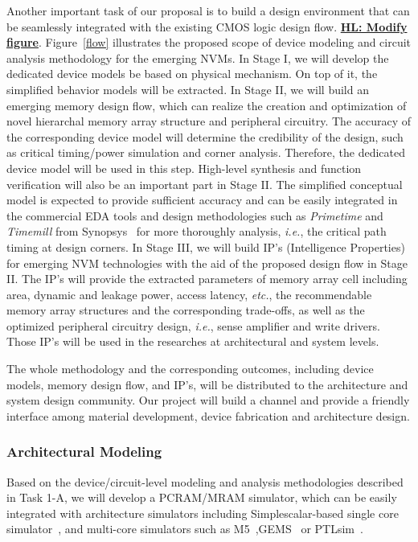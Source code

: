 Another important task of our proposal is to build a design environment that can be seamlessly integrated with the existing CMOS logic design flow. \textbf{\underline{HL: Modify figure}}. Figure~\ref{flow} illustrates the proposed scope of device modeling and circuit analysis methodology for the emerging NVMs. In Stage I, we will develop the dedicated device models be based on physical mechanism. On top of it, the simplified behavior models will be extracted. In Stage II, we will build an emerging memory design flow, which can realize the creation and optimization of novel hierarchal memory array structure and peripheral circuitry. The accuracy of the corresponding device model will determine the credibility of the design, such as critical timing/power simulation and corner analysis. Therefore, the dedicated device model will be used in this step. High-level synthesis and function verification will also be an important part in Stage II. The simplified conceptual model is expected to provide sufficient accuracy and %
can be easily integrated in the commercial EDA tools and design methodologies such as \emph{Primetime} and \emph{Timemill} from Synopsys~\cite{synopsys} for more thoroughly analysis, \emph{i.e.}, the critical path timing at design corners. In Stage III, we will build IP's (Intelligence Properties) for emerging NVM technologies with the aid of the proposed design flow in Stage II. The IP's will provide the extracted parameters of memory array cell including area, dynamic and leakage power, access latency, \emph{etc.}, the recommendable memory array structures and the corresponding trade-offs, as well as the optimized peripheral circuitry design, \emph{i.e.}, sense amplifier and write drivers. Those IP's will be used in the researches at architectural and system levels.

The whole methodology and the corresponding outcomes, including device models, memory design flow, and IP's, will be distributed to the architecture and system design community. Our project will build a channel and provide a friendly interface among material development, device fabrication and architecture design.

\subsubsection{Architectural Modeling}

Based on the device/circuit-level modeling and analysis methodologies described in Task 1-A, we will develop a PCRAM/MRAM simulator, which can be easily integrated with architecture simulators including Simplescalar-based single core simulator~\cite{simplescalar:computer02,sim-alpha}, and multi-core simulators such as M5~\cite{3D:M5},GEMS~\cite{martin:can05} or PTLsim~\cite{PTLsim}.

